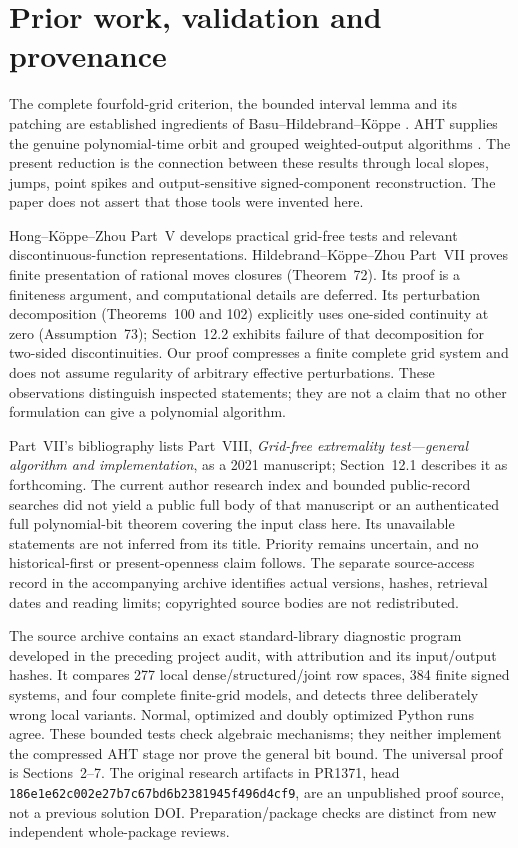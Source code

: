 \documentclass[11pt]{article}
\begin{document}
\section{Prior work, validation and provenance}\label{sec:priority}
The complete fourfold-grid criterion, the bounded interval lemma and its patching are established ingredients of Basu--Hildebrand--K\"oppe \cite{BHK}. AHT supplies the genuine polynomial-time orbit and grouped weighted-output algorithms \cite{AHT}. The present reduction is the connection between these results through local slopes, jumps, point spikes and output-sensitive signed-component reconstruction. The paper does not assert that those tools were invented here.

Hong--K\"oppe--Zhou Part~V \cite{PartV} develops practical grid-free tests and relevant discontinuous-function representations. Hildebrand--K\"oppe--Zhou Part~VII \cite{PartVII} proves finite presentation of rational moves closures (Theorem~72). Its proof is a finiteness argument, and computational details are deferred. Its perturbation decomposition (Theorems~100 and 102) explicitly uses one-sided continuity at zero (Assumption~73); Section~12.2 exhibits failure of that decomposition for two-sided discontinuities. Our proof compresses a finite complete grid system and does not assume regularity of arbitrary effective perturbations. These observations distinguish inspected statements; they are not a claim that no other formulation can give a polynomial algorithm.

Part~VII's bibliography lists Part~VIII, \emph{Grid-free extremality test---general algorithm and implementation}, as a 2021 manuscript; Section~12.1 describes it as forthcoming. The current author research index and bounded public-record searches did not yield a public full body of that manuscript or an authenticated full polynomial-bit theorem covering the input class here. Its unavailable statements are not inferred from its title. Priority remains uncertain, and no historical-first or present-openness claim follows. The separate source-access record in the accompanying archive identifies actual versions, hashes, retrieval dates and reading limits; copyrighted source bodies are not redistributed.

The source archive contains an exact standard-library diagnostic program developed in the preceding project audit, with attribution and its input/output hashes. It compares 277 local dense/structured/joint row spaces, 384 finite signed systems, and four complete finite-grid models, and detects three deliberately wrong local variants. Normal, optimized and doubly optimized Python runs agree. These bounded tests check algebraic mechanisms; they neither implement the compressed AHT stage nor prove the general bit bound. The universal proof is Sections~2--7. The original research artifacts in PR1371, head \texttt{186e1e62c002e27b7c67bd6b2381945f496d4cf9}, are an unpublished proof source, not a previous solution DOI. Preparation/package checks are distinct from new independent whole-package reviews.
\end{document}
